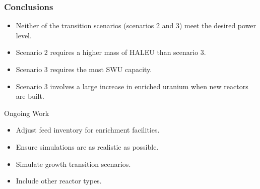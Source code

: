 \begin{frame}
\frametitle{Conclusions}
    \begin{itemize}
        \item Neither of the transition scenarios (scenarios 2 and 3) meet the desired power level.
        \item Scenario 2 requires a higher mass of \gls{HALEU} than scenario 3.
        \item Scenario 3 requires the most \gls{SWU} capacity.
        \item Scenario 3 involves a large increase in enriched uranium when 
              new reactors are built.
    \end{itemize}

    \begin{block}{Ongoing Work}
        \begin{itemize}
            \item Adjust feed inventory for enrichment facilities.
            \item Ensure simulations are as realistic as possible.
            \item Simulate growth transition scenarios.
            \item Include other reactor types.
        \end{itemize}
    \end{block}
    

\end{frame}
